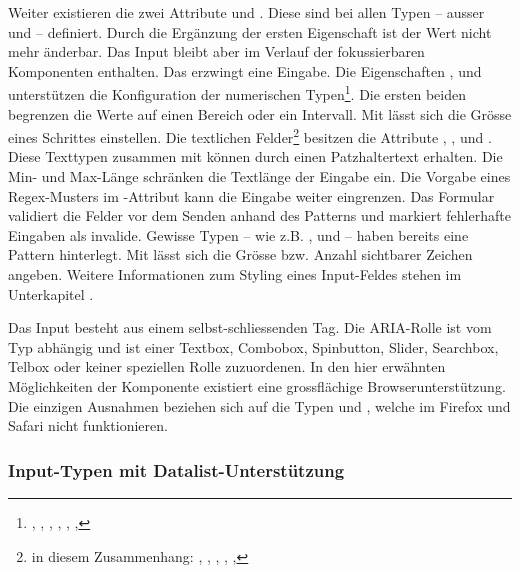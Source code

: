 Weiter existieren die zwei Attribute  und . 
Diese sind bei allen Typen – ausser  und  – definiert. 
Durch die Ergänzung der ersten Eigenschaft ist der Wert nicht mehr änderbar. 
Das Input bleibt aber im Verlauf der fokussierbaren Komponenten enthalten. 
Das  erzwingt eine Eingabe. 
Die Eigenschaften ,  und  unterstützen die Konfiguration der numerischen Typen\footnote{
    , , , , , , 
}. 
Die ersten beiden begrenzen die Werte auf einen Bereich oder ein Intervall. 
Mit  lässt sich die Grösse eines Schrittes einstellen. 
Die textlichen Felder\footnote{
    in diesem Zusammenhang: , , , , , 
} besitzen die Attribute , ,  und . 
Diese Texttypen zusammen mit  können durch  einen Patzhaltertext erhalten. 
Die Min- und Max-Länge schränken die Textlänge der Eingabe ein. 
Die Vorgabe eines Regex-Musters im -Attribut kann die Eingabe weiter eingrenzen. 
Das Formular validiert die Felder vor dem Senden anhand des Patterns und markiert fehlerhafte Eingaben als invalide.
Gewisse Typen – wie z.B. ,  und  – haben bereits eine Pattern hinterlegt. 
Mit  lässt sich die Grösse bzw. Anzahl sichtbarer Zeichen angeben. 
Weitere Informationen zum Styling eines Input-Feldes stehen im Unterkapitel \textbf{}. 

Das Input besteht aus einem selbst-schliessenden Tag. 
Die ARIA-Rolle ist vom Typ abhängig und ist einer Textbox, Combobox, Spinbutton, Slider, Searchbox, Telbox oder keiner speziellen Rolle zuzuordenen.  
In den hier erwähnten Möglichkeiten der Komponente existiert eine grossflächige Browserunterstützung. 
Die einzigen Ausnahmen beziehen sich auf die Typen  und , welche im Firefox und Safari nicht funktionieren. 


\subsubsection{\color{dblue} {\color{dgray} Input-Typen mit Datalist-Unterstützung}}
\label{sec:inputTypesDatalist}


